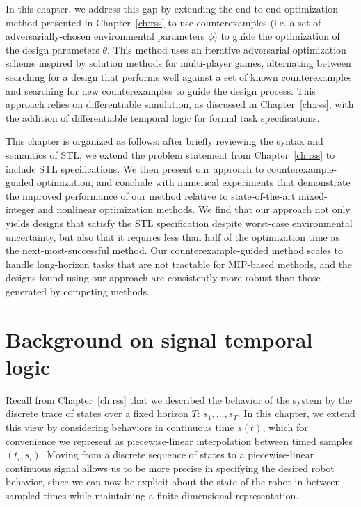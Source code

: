 In this chapter, we address this gap by extending the end-to-end optimization method presented in Chapter~\ref{ch:rss} to use counterexamples (i.e. a set of adversarially-chosen environmental parameters $\phi$) to guide the optimization of the design parameters $\theta$. This method uses an iterative adversarial optimization scheme inspired by solution methods for multi-player games, alternating between searching for a design that performs well against a set of known counterexamples and searching for new counterexamples to guide the design process. This approach relies on differentiable simulation, as discussed in Chapter~\ref{ch:rss}, with the addition of differentiable temporal logic for formal task specifications.

This chapter is organized as follows: after briefly reviewing the syntax and semantics of STL, we extend the problem statement from Chapter~\ref{ch:rss} to include STL specifications. We then present our approach to counterexample-guided optimization, and conclude with numerical experiments that demonstrate the improved performance of our method relative to state-of-the-art mixed-integer and nonlinear optimization methods. We find that our approach not only yields designs that satisfy the STL specification despite worst-case environmental uncertainty, but also that it requires less than half of the optimization time as the next-most-successful method. Our counterexample-guided method scales to handle long-horizon tasks that are not tractable for MIP-based methods, and the designs found using our approach are consistently more robust than those generated by competing methods.

\section{Background on signal temporal logic}

Recall from Chapter~\ref{ch:rss} that we described the behavior of the system by the discrete trace of states over a fixed horizon $T$: $s_1, \ldots, s_T$. In this chapter, we extend this view by considering behaviors in continuous time $s(t)$, which for convenience we represent as piecewise-linear interpolation between timed samples $(t_i, s_i)$. Moving from a discrete sequence of states to a piecewise-linear continuous signal allows us to be more precise in specifying the desired robot behavior, since we can now be explicit about the state of the robot in between sampled times while maintaining a finite-dimensional representation.

